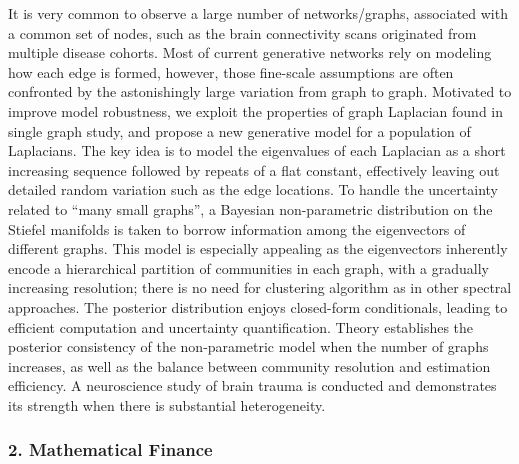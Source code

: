 \begin{itemize}
It is very common to observe a large number of networks/graphs, associated with a common set of nodes, such as the brain connectivity scans originated from multiple disease cohorts. Most of current generative networks rely on modeling how each edge is formed, however, those fine-scale assumptions are often confronted by the astonishingly large variation from graph to graph. Motivated to improve model robustness, we exploit the properties of graph Laplacian found in single graph study, and propose a new generative model for a population of Laplacians. The key idea is to model the eigenvalues of each Laplacian as a short increasing sequence followed by repeats of a flat constant, effectively leaving out detailed random variation such as the edge locations. To handle the uncertainty related to ``many small graphs'', a Bayesian non-parametric distribution on the Stiefel manifolds is taken to borrow information among the eigenvectors of different graphs. This model is especially appealing as the eigenvectors inherently encode a hierarchical partition of communities in each graph, with a gradually increasing resolution; there is no need for clustering algorithm as in other spectral approaches. The posterior distribution enjoys closed-form conditionals, leading to efficient computation and uncertainty quantification. Theory establishes the posterior consistency of the non-parametric model when the number of graphs increases, as well as the balance between community resolution and estimation efficiency. A neuroscience study of brain trauma is conducted and demonstrates its strength when there is substantial heterogeneity.

\end{itemize}

\subsubsection*{2. Mathematical Finance}

